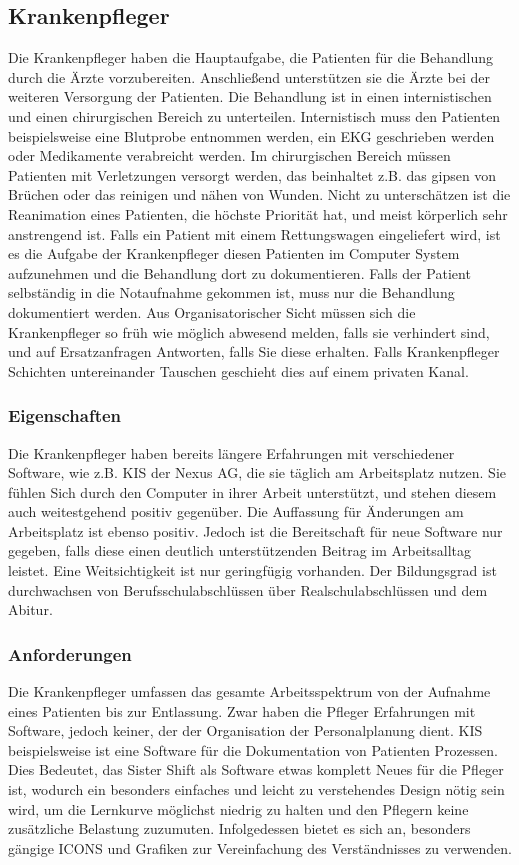\documentclass[11pt,
paper=a4,
bibtotocnumbered,	  %
liststotocnumbered,  %
DIV=calc,		  %
tablecaptionabove,	  %
headinclude,
]{article}
\begin{document}
\subsection{Krankenpfleger}
Die Krankenpfleger haben die Hauptaufgabe, die Patienten für die Behandlung durch die Ärzte vorzubereiten. Anschließend unterstützen sie die Ärzte bei der weiteren Versorgung der Patienten. Die Behandlung ist in einen internistischen und einen chirurgischen Bereich zu unterteilen. Internistisch muss den Patienten beispielsweise eine Blutprobe entnommen werden, ein EKG geschrieben werden oder Medikamente verabreicht werden. Im chirurgischen Bereich müssen Patienten mit Verletzungen versorgt werden, das beinhaltet z.B. das gipsen von Brüchen oder das reinigen und nähen von Wunden. Nicht zu unterschätzen ist die Reanimation eines Patienten, die höchste Priorität hat, und meist körperlich sehr anstrengend ist. Falls ein Patient mit einem Rettungswagen eingeliefert wird, ist es die Aufgabe der Krankenpfleger diesen Patienten im Computer System aufzunehmen und die Behandlung dort zu dokumentieren. Falls der Patient selbständig in die Notaufnahme gekommen ist, muss nur die Behandlung dokumentiert werden. Aus Organisatorischer Sicht müssen sich die Krankenpfleger so früh wie möglich abwesend melden, falls sie verhindert sind, und auf Ersatzanfragen Antworten, falls Sie diese erhalten. Falls Krankenpfleger Schichten untereinander Tauschen geschieht dies auf einem privaten Kanal.
\subsubsection{Eigenschaften}
Die Krankenpfleger haben bereits längere Erfahrungen mit verschiedener Software, wie z.B. KIS der Nexus AG, die sie täglich am Arbeitsplatz nutzen. Sie fühlen Sich durch den Computer in ihrer Arbeit unterstützt, und stehen diesem auch weitestgehend positiv gegenüber. Die Auffassung für Änderungen am Arbeitsplatz ist ebenso positiv. Jedoch ist die Bereitschaft für neue Software nur gegeben, falls diese einen deutlich unterstützenden Beitrag im Arbeitsalltag leistet. Eine Weitsichtigkeit ist nur geringfügig vorhanden. Der Bildungsgrad ist durchwachsen von Berufsschulabschlüssen über Realschulabschlüssen und dem Abitur.
\subsubsection{Anforderungen}
Die Krankenpfleger umfassen das gesamte Arbeitsspektrum von der Aufnahme eines Patienten bis zur Entlassung. Zwar haben die Pfleger Erfahrungen mit Software, jedoch keiner, der der Organisation der Personalplanung dient. KIS beispielsweise ist eine Software für die Dokumentation von Patienten Prozessen. Dies Bedeutet, das Sister Shift als Software etwas komplett Neues für die Pfleger ist, wodurch ein besonders einfaches und leicht zu verstehendes Design nötig sein wird, um die Lernkurve möglichst niedrig zu halten und den Pflegern keine zusätzliche Belastung zuzumuten. 
Infolgedessen bietet es sich an, besonders gängige ICONS und Grafiken zur Vereinfachung des Verständnisses zu verwenden.
\end{document}
